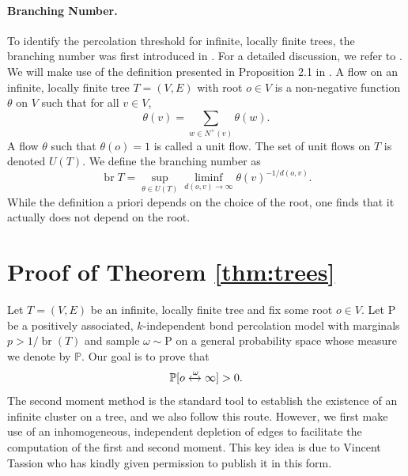 \documentclass[11pt]{article}
\renewcommand{\P}{\mathrm{P}}
\DeclareMathOperator{\br}{br}
\theoremstyle{remark}
\begin{document}
\paragraph{Branching Number.} To identify the percolation threshold for infinite, locally finite trees, the branching number was first introduced in \cite{Lyons1990}. For a detailed discussion, we refer to \cite{Lyons2016}. We will make use of the definition presented in Proposition 2.1 in \cite{Lyons1990}. A flow on an infinite, locally finite tree $T=(V,E)$ with root $o \in V$ is a non-negative function $\theta$ on $V$ such that for all $v \in V$,
$$
\theta(v)=\sum_{w \in N^+(v)} \theta(w) .
$$
A flow $\theta$ such that $\theta(o)=1$ is called a unit flow. The set of unit flows on $T$ is denoted $U(T)$. We define the branching number as 
\[\operatorname{br} T=\sup _{\theta \in U(T)} \liminf_{d(o,v) \rightarrow \infty} \theta(v)^{-1 /d(o,v)} .\]
While the definition a priori depends on the choice of the root, one finds that it actually does not depend on the root.




\section{Proof of Theorem \ref{thm:trees}}
\label{sec:trees}

Let $T=(V,E)$ be an infinite, locally finite tree and fix some root $o \in V$. Let $\P$ be a positively associated, $k$-independent bond percolation model with marginals $p>1/\br(T)$ and sample $\omega\sim\P$ on a general probability space whose measure we denote by $\mathbb P$. Our goal is to prove that
\begin{equation}\label{eq:7}
	\mathbb P[o\xleftrightarrow{\omega} \infty] >0.
\end{equation}
The second moment method is the standard tool to establish the existence of an infinite cluster on a tree, and we also follow this route. However, we first make use of an inhomogeneous, independent depletion of edges to facilitate the computation of the first and second moment. This key idea is due to Vincent Tassion who has kindly given permission to publish it in this form.
\end{document}
